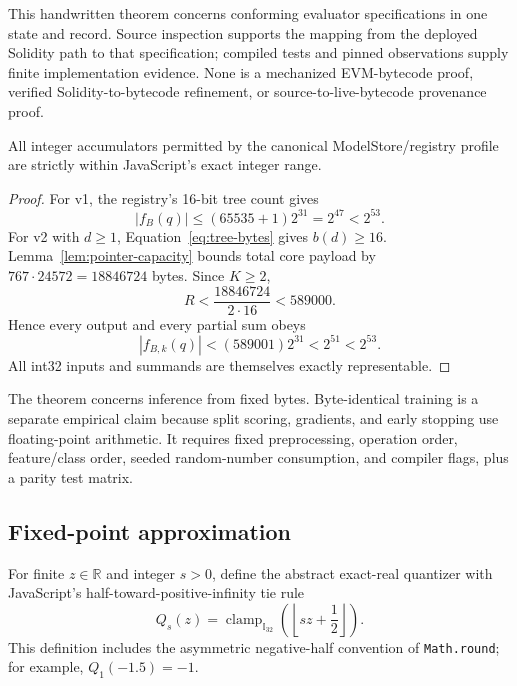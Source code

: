 \begin{remark}
This handwritten theorem concerns conforming evaluator specifications in one
state and record. Source inspection supports the mapping from the deployed
Solidity path to that specification; compiled tests and pinned observations
supply finite implementation evidence. None is a mechanized EVM-bytecode proof,
verified Solidity-to-bytecode refinement, or source-to-live-bytecode provenance proof.
\end{remark}

\begin{proposition}
\label{prop:js-safe}
All integer accumulators permitted by the canonical ModelStore/registry
profile are strictly within JavaScript's exact integer range.
\end{proposition}

\begin{proof}
For v1, the registry's 16-bit tree count gives
\[
 |f_B(q)|\le (65535+1)2^{31}=2^{47}<2^{53}.
\]
For v2 with $d\ge1$, Equation~\ref{eq:tree-bytes} gives $b(d)\ge16$.
Lemma~\ref{lem:pointer-capacity} bounds total core payload by
$767\cdot24572=18846724$ bytes.  Since $K\ge2$,
\[
 R < \frac{18846724}{2\cdot16}<589000.
\]
Hence every output and every partial sum obeys
\[
 |f_{B,k}(q)|<(589001)2^{31}<2^{51}<2^{53}.
\]
All int32 inputs and summands are themselves exactly representable.
\end{proof}

\begin{remark}
The theorem concerns inference from fixed bytes.  Byte-identical training is a
separate empirical claim because split scoring, gradients, and early stopping
use floating-point arithmetic.  It requires fixed preprocessing, operation
order, feature/class order, seeded random-number consumption, and compiler
flags, plus a parity test matrix.
\end{remark}

\subsection{Fixed-point approximation}

For finite $z\in\mathbb{R}$ and integer $s>0$, define the abstract exact-real
quantizer with JavaScript's half-toward-positive-infinity tie rule
\begin{equation}
  Q_s(z)=\operatorname{clamp}_{\mathbb{I}_{32}}
  \left(\left\lfloor sz+\frac12\right\rfloor\right).
  \label{eq:quantizer}
\end{equation}
This definition includes the asymmetric negative-half convention of
\texttt{Math.round}; for example, $Q_1(-1.5)=-1$.

